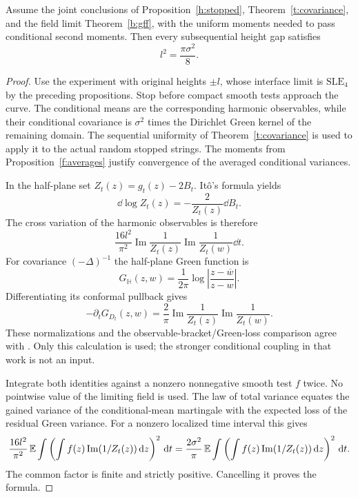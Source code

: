 \begin{proposition}\label{h:normalization}
Assume the joint conclusions of Proposition~\ref{h:stopped},
Theorem~\ref{t:covariance}, and the field limit
Theorem~\ref{b:gff}, with the uniform moments needed to pass conditional
second moments. Then every subsequential height gap satisfies
\[
 l^2=\frac{\pi\sigma^2}{8}.
\]
\end{proposition}
\begin{proof}
Use the experiment with original heights $\pm l$, whose interface limit
is $\mathrm{SLE}_4$ by the preceding propositions. Stop before compact
smooth tests approach the curve. The conditional means are the
corresponding harmonic observables, while their conditional covariance
is $\sigma^2$ times the Dirichlet Green kernel of the remaining domain.
The sequential uniformity of Theorem~\ref{t:covariance} is used to
apply it to the actual random stopped strings. The moments from
Proposition~\ref{f:averages} justify convergence of the averaged
conditional variances.

In the half-plane set $Z_t(z)=g_t(z)-2B_t$. It\^o's formula yields
\[
 \dd\log Z_t(z)=-\frac{2}{Z_t(z)}\dd B_t.
\]
The cross variation of the harmonic observables is therefore
\begin{equation}\label{h:mean-bracket}
 \frac{16l^2}{\pi^2}
       \operatorname{Im}\frac1{Z_t(z)}
       \operatorname{Im}\frac1{Z_t(w)}\dd t.
\end{equation}
For covariance $(-\Delta)^{-1}$ the half-plane Green function is
\[
 G_{\mathbb H}(z,w)=\frac1{2\pi}
       \log\left|\frac{z-\overline w}{z-w}\right|.
\]
Differentiating its conformal pullback gives
\begin{equation}\label{h:green-loss}
 -\partial_tG_{D_t}(z,w)=\frac2\pi
       \operatorname{Im}\frac1{Z_t(z)}
       \operatorname{Im}\frac1{Z_t(w)}.
\end{equation}
These normalizations and the observable-bracket/Green-loss comparison
agree with \cite[preprint version, Lemmas 2.5--2.6,
equations (2.3)--(2.4)]{SScontinuum}.
Only this calculation is used; the stronger conditional coupling
in that work is not an input.

Integrate both identities against a nonzero nonnegative smooth test
$f$ twice. No pointwise value of the limiting field is used. The law
of total variance equates the gained variance of the conditional-mean
martingale with the expected loss of the residual Green variance.
For a nonzero localized time interval this gives
\[
 \frac{16l^2}{\pi^2}\,
 \mathbb E\int\left(\int f(z)\operatorname{Im}(1/Z_t(z))\,\mathrm d z\right)^2\,\mathrm d t
 =
 \frac{2\sigma^2}{\pi}\,
 \mathbb E\int\left(\int f(z)\operatorname{Im}(1/Z_t(z))\,\mathrm d z\right)^2\,\mathrm d t.
\]
The common factor is finite and strictly positive. Cancelling it
proves the formula.
\end{proof}

